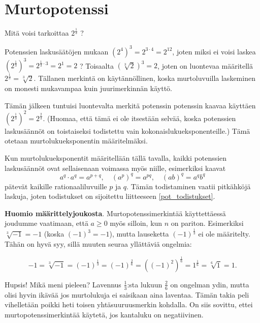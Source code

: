 \chapter{Murtopotenssi}

Mitä voisi tarkoittaa $2^\frac{1}{3}$ ?

Potenssien laskusäätöjen mukaan $(2^4)^3 = 2^{3\cdot 4} = 2^{12}$, joten miksi ei voisi laskea $\left( 2^{\frac{1}{3}}\right)^3 = 2^{\frac{1}{3}\cdot 3} = 2^1=2$ ? Toisaalta $(\sqrt[3]{2})^3=2$, joten on luontevaa määritellä $2^{\frac{1}{3}} = \sqrt[3]{2}$. Tällanen merkintä on käytännöllinen, koska murtoluvuilla laskeminen on monesti mukavampaa kuin juurimerkinnän käyttö.


Tämän jälkeen tuntuisi luontevalta merkitä potenssin potenssin kaavaa käyttäen $(2^{\frac{1}{3}})^2 = 2^{\frac{2}{3}}.$ (Huomaa, että tämä ei ole itsestään selvää, koska potenssien laskusäännöt on toistaiseksi todistettu vain kokonaislukueksponenteille.) Tämä otetaan murtolukueksponentin määritelmäksi.


Kun murtolukueksponentit määritellään tällä tavalla, kaikki potenssien
laskusäännöt ovat sellaisenaan voimassa myös niille, esimerkiksi kaavat
\[ a^q\cdot a^q = a^{p+q}, \quad (a^p)^q = a^{pq}, \quad (ab)^q=a^qb^q \]
pätevät kaikille rationaaliluvuille $p$ ja $q$. Tämän todistaminen vaatii pitkähköjä
laskuja, joten todistukset on sijoitettu liitteeseen \ref{pot_todistukset}.

{\bf Huomio määrittelyjoukosta}. Murtopotenssimerkintää käyttettäessä joudumme vaatimaan, että $a\geq 0$ myös silloin, kun $n$ on pariton. Esimerkiksi $\sqrt[3]{-1}=-1$ (koska $(-1)^3=-1$), mutta lauseketta $(-1)^\frac{1}{3}$ ei ole määritelty. Tähän on hyvä syy, sillä muuten seuraa yllättäviä ongelmia:

\[ -1 = \sqrt[3]{-1} = (-1)^\frac{1}{3} = (-1)^\frac{2}{6}
= ((-1)^2)^\frac{1}{6} = 1^\frac{1}{6} = \sqrt[6]{1} = 1. \]

Hupsis! Mikä meni pieleen? Lavennus $\frac{1}{3}$:sta lukuun $\frac{2}{6}$ on ongelman ydin, mutta olisi hyvin ikävää jos murtolukuja ei saisikaan aina laventaa. Tämän takia peli vihelletään poikki
heti toisen yhtäsuuruusmerkin kohdalla. On siis sovittu, ettei
murtopotenssimerkintää käytetä, jos kantaluku on negatiivinen.

